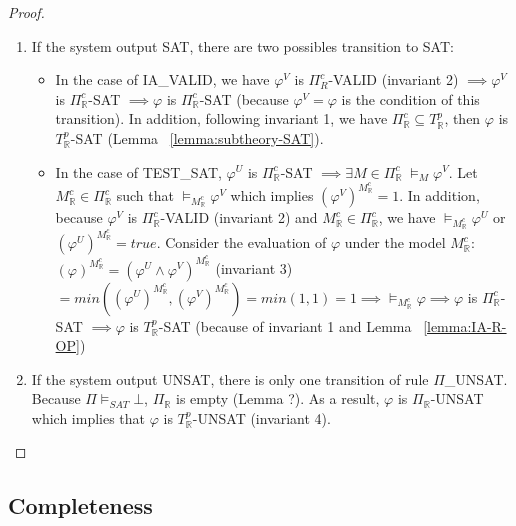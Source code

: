 \begin{proof}
\begin{enumerate}
\item If the system output SAT, there are two possibles transition to SAT:
\begin{itemize}
\item In the case of IA\_VALID, we have $\varphi^V$ is $\Pi^c_{R}$-VALID (invariant 2) $\implies \varphi^V$ is $\Pi^c_\mathbb{R}$-SAT $\implies \varphi$ is $\Pi^c_\mathbb{R}$-SAT (because $\varphi^V = \varphi$ is the condition of this transition). In addition, following invariant 1, we have $\Pi^c_\mathbb{R} \subseteq T^p_\mathbb{R}$, then $\varphi$ is $T^p_\mathbb{R}$-SAT (Lemma ~\ref{lemma:subtheory-SAT}).
\item \sloppy In the case of TEST\_SAT, $\varphi^U$ is $\Pi^c_\mathbb{R}$-SAT $\implies \exists M \in \Pi^c_\mathbb{R} \; \models_M \varphi^V$. Let ${M^c_\mathbb{R} \in \Pi^c_\mathbb{R}}$ such that $\models_{M^c_\mathbb{R}} \varphi^V$ which implies $(\varphi^V)^{M^c_\mathbb{R}} = 1$. In addition, because $\varphi^V$ is $\Pi^c_\mathbb{R}$-VALID (invariant 2) and $M^c_\mathbb{R} \in \Pi^c_\mathbb{R}$, we have $\models_{M^c_\mathbb{R}} \varphi^U$ or $(\varphi^U)^{M^c_\mathbb{R}} = true$. Consider the evaluation of $\varphi$ under the model $M^c_\mathbb{R}$: ${(\varphi)^{M^c_\mathbb{R}} = (\varphi^U \wedge \varphi^V)^{M^c_\mathbb{R}}}$ (invariant 3) $= min((\varphi^U)^{M^c_\mathbb{R}}, (\varphi^V)^{M^c_\mathbb{R}}) = min(1, 1) = 1 \implies \models_{M^c_\mathbb{R}} \varphi \implies \varphi$ is $\Pi^c_\mathbb{R}$-SAT $\implies \varphi$ is $T^p_\mathbb{R}$-SAT (because of invariant 1 and Lemma ~\ref{lemma:IA-R-OP})
\end{itemize}
\item  If the system output UNSAT, there is only one transition of rule $\Pi$\_UNSAT. Because $\Pi \models_{SAT} \bot$, $\Pi_\mathbb{R}$ is empty (Lemma ?). As a result, $\varphi$ is $\Pi_\mathbb{R}$-UNSAT which implies that $\varphi$ is $T^p_\mathbb{R}$-UNSAT (invariant 4).
\end{enumerate}
\end{proof}

\subsection{Completeness}


